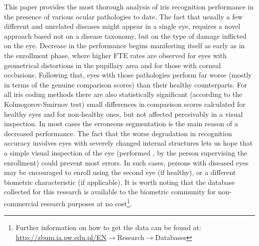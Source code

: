 \documentclass[10pt,twocolumn,letterpaper]{article}
\begin{document}
This paper provides the most thorough analysis of iris recognition performance in the presence of various ocular pathologies to date. The fact that usually a few different and unrelated diseases might appear in a single eye, requires a novel approach based not on a disease taxonomy, but on the type of damage inflicted on the eye. Decrease in the performance begins manifesting itself as early as in the enrollment phase, where higher FTE rates are observed for eyes with geometrical distortions in the pupillary area and for those with corneal occlusions. Following that, eyes with those pathologies perform far worse (mostly in terms of the genuine comparison scores) than their healthy counterparts. For all iris coding methods there are also statistically significant (according to the Kolmogorov-Smirnov test) small differences in comparison scores calculated for healthy eyes and for non-healthy ones, but not affected perceivably in a visual inspection. In most cases the erroneous segmentation is the main reason of a decreased performance. The fact that the worse degradation in recognition accuracy involves eyes with severely changed internal structures lets us hope that a simple visual inspection of the eye (performed \eg, by the person supervising the enrollment) could prevent most errors. In such cases, persons with diseased eyes may be encouraged to enroll using the second eye (if healthy), or a different biometric characteristic (if applicable). It is worth noting that the database collected for this research is available to the biometric community for non-commercial research purposes at no cost\footnote{Further information on how to get the data can be found at: \\\url{http://zbum.ia.pw.edu.pl/EN}$\rightarrow$Research$\rightarrow$Databases}. 

{\small


}
\end{document}
